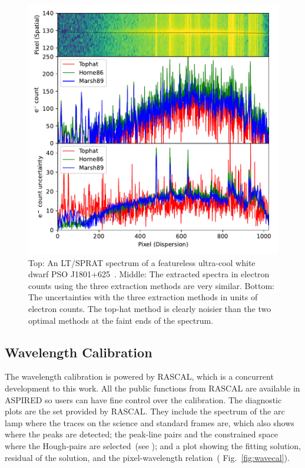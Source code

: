 \documentclass[twocolumn, linenumbers]{aastex631}
\begin{document}
\begin{figure}
    \centering
    \includegraphics[width=\columnwidth]{fig_04_extraction_compared.pdf}
    \caption{Top: An LT/SPRAT spectrum of a featureless ultra-cool white dwarf PSO J1801+625~\citep{2020MNRAS.493.6001L}.
    Middle: The extracted spectra in electron counts using the three extraction methods
    are very similar. Bottom: The uncertainties with the three extraction methods
    in units of electron counts. The
    top-hat method is clearly noisier than the two optimal methods at the faint ends of the spectrum.}
    \label{fig:extraction_compared}
\end{figure}

\subsection{Wavelength Calibration}
The wavelength calibration is powered by \textsc{RASCAL}, which is a concurrent
development to this work. All the public functions from \textsc{RASCAL} are
available in \textsc{ASPIRED} so users can have fine control over the
calibration. The diagnostic plots are the set provided by \textsc{RASCAL}.
They include the spectrum of the arc lamp where the traces on the science and
standard frames are, which also shows where the peaks are detected; the
peak-line pairs and the constrained space where the Hough-pairs are
selected~(see \citealt{2020ASPC..527..627V}); and a plot showing the fitting
solution, residual of the solution, and the pixel-wavelength relation~(
Fig.~\ref{fig:wavecal}).
\end{document}
